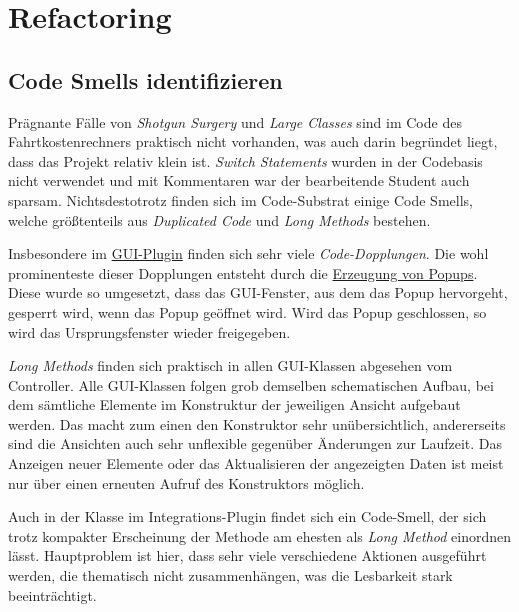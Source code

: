 \chapter{Refactoring}

\section{Code Smells identifizieren}
Prägnante Fälle von \emph{Shotgun Surgery} und \emph{Large Classes} sind im Code des Fahrtkostenrechners praktisch nicht vorhanden, was auch darin begründet liegt, dass das Projekt relativ klein ist.
\emph{Switch Statements} wurden in der Codebasis nicht verwendet und mit Kommentaren war der bearbeitende Student auch sparsam.
Nichtsdestotrotz finden sich im Code-Substrat einige Code Smells, welche größtenteils aus \emph{Duplicated Code} und \emph{Long Methods} bestehen.

Insbesondere im \href{https://github.com/yschiebelhut/carpool-java/tree/6a206569e676ad1bf55d68ba3e64408bae83e73f/0-carpool-java-plugin-ui}{GUI-Plugin} finden sich sehr viele \emph{Code-Dopplungen}.
Die wohl prominenteste dieser Dopplungen entsteht durch die \href{https://github.com/yschiebelhut/carpool-java/blob/6a206569e676ad1bf55d68ba3e64408bae83e73f/0-carpool-java-plugin-ui/src/main/java/gui/MainGUI.java#L42}{Erzeugung von Popups}.
Diese wurde so umgesetzt, dass das GUI-Fenster, aus dem das Popup hervorgeht, gesperrt wird, wenn das Popup geöffnet wird.
Wird das Popup geschlossen, so wird das Ursprungsfenster wieder freigegeben.

\emph{Long Methods} finden sich praktisch in allen GUI-Klassen abgesehen vom Controller.
Alle GUI-Klassen folgen grob demselben schematischen Aufbau, bei dem sämtliche Elemente im Konstruktur der jeweiligen Ansicht aufgebaut werden.
Das macht zum einen den Konstruktor sehr unübersichtlich, andererseits sind die Ansichten auch sehr unflexible gegenüber Änderungen zur Laufzeit.
Das Anzeigen neuer Elemente oder das Aktualisieren der angezeigten Daten ist meist nur über einen erneuten Aufruf des Konstruktors möglich.

Auch in der Klasse \href{https://github.com/yschiebelhut/carpool-java/blob/fcc3bbaff5e8908a5f768b7fd3e79f1d2285acb6/0-carpool-java-integration/src/main/java/telegram/Telegram.java}{} im Integrations-Plugin findet sich ein Code-Smell, der sich trotz kompakter Erscheinung der Methode am ehesten als \emph{Long Method} einordnen lässt.
Hauptproblem ist hier, dass sehr viele verschiedene Aktionen ausgeführt werden, die thematisch nicht zusammenhängen, was die Lesbarkeit stark beeinträchtigt.

